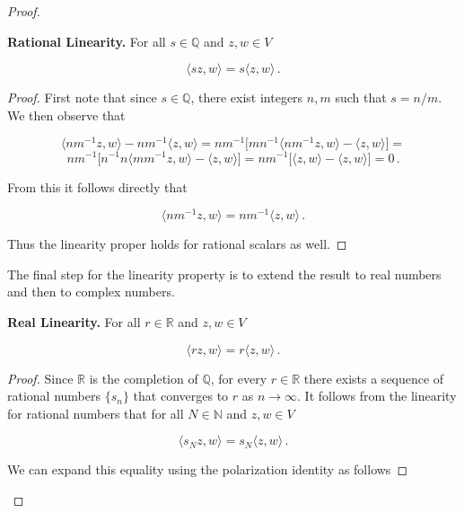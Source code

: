 \documentclass[a4paper]{article}
\numberwithin{equation}{section}
\begin{document}
\begin{description}
\begin{proof}
\begin{description}

\item \textbf{Rational Linearity.} For all $s \in \mathbb{Q}$ and $z,w \in V$

$$\langle sz,w \rangle = s\langle z,w \rangle\,.$$

\begin{proof} First note that since $s \in \mathbb{Q}$, there exist integers $n,m$ such that $s = n/m$. We then observe that

$$\langle nm^{-1}z,w \rangle - nm^{-1}\langle z,w \rangle = nm^{-1}\big[mn^{-1}\langle nm^{-1}z,w \rangle - \langle z,w \rangle \big] =$$
$$ nm^{-1}\big[n^{-1}n\langle mm^{-1}z,w \rangle - \langle z,w \rangle \big] = nm^{-1}\big[\langle z,w \rangle - \langle z,w \rangle \big] = 0\,.$$

From this it follows directly that 

$$\langle nm^{-1}z,w \rangle = nm^{-1}\langle z,w \rangle\,.$$

Thus the linearity proper holds for rational scalars as well.

\end{proof}

\end{description}


The final step for the linearity property is to extend the result to real numbers and then to complex numbers.


\begin{description}

\item \textbf{Real Linearity.} For all $r \in \mathbb{R}$ and $z,w \in V$

$$\langle rz,w \rangle = r\langle z,w \rangle\,.$$

\begin{proof} Since $\mathbb{R}$ is the completion of $\mathbb{Q}$, for every $r \in \mathbb{R}$ there exists a sequence of rational numbers $\lbrace s_n \rbrace$ that converges to $r$ as $n \rightarrow \infty$. It follows from the linearity for rational numbers that for all $N \in \mathbb{N}$ and $z,w \in V$

$$\langle s_Nz,w \rangle = s_N\langle z,w \rangle\,.$$

We can expand this equality using the polarization identity as follows


\end{proof}
\end{description}
\end{proof}
\end{description}
\end{document}

